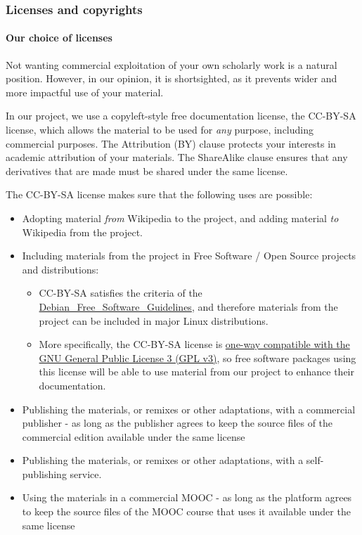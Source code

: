 \hypertarget{licenses-and-copyrights}{%
\subsubsection{Licenses and copyrights}\label{licenses-and-copyrights}}

\hypertarget{our-choice-of-licenses}{%
\paragraph{Our choice of licenses}\label{our-choice-of-licenses}}

Not wanting commercial exploitation of your own scholarly work is a
natural position. However, in our opinion, it is shortsighted, as it
prevents wider and more impactful use of your material.

In our project, we use a copyleft-style free documentation license, the
CC-BY-SA license, which allows the material to be used for \emph{any}
purpose, including commercial purposes. The Attribution (BY) clause
protects your interests in academic attribution of your materials. The
ShareAlike clause ensures that any derivatives that are made must be
shared under the same license.

The CC-BY-SA license makes sure that the following uses are possible:

\begin{itemize}
\tightlist
\item
  Adopting material \emph{from} Wikipedia to the project, and adding
  material \emph{to} Wikipedia from the project.
\item
  Including materials from the project in Free Software / Open Source
  projects and distributions:

  \begin{itemize}
  \tightlist
  \item
    CC-BY-SA satisfies the criteria of the
    \href{https://en.wikipedia.org/wiki/Debian_Free_Software_Guidelines}{Debian\_Free\_Software\_Guidelines},
    and therefore materials from the project can be included in major
    Linux distributions.
  \item
    More specifically, the CC-BY-SA license is
    \href{https://creativecommons.org/2015/10/08/cc-by-sa-4-0-now-one-way-compatible-with-gplv3/}{one-way
    compatible with the GNU General Public License 3 (GPL v3)}, so free
    software packages using this license will be able to use material
    from our project to enhance their documentation.
  \end{itemize}
\item
  Publishing the materials, or remixes or other adaptations, with a
  commercial publisher - as long as the publisher agrees to keep the
  source files of the commercial edition available under the same
  license
\item
  Publishing the materials, or remixes or other adaptations, with a
  self-publishing service.
\item
  Using the materials in a commercial MOOC - as long as the platform
  agrees to keep the source files of the MOOC course that uses it
  available under the same license
\end{itemize}

